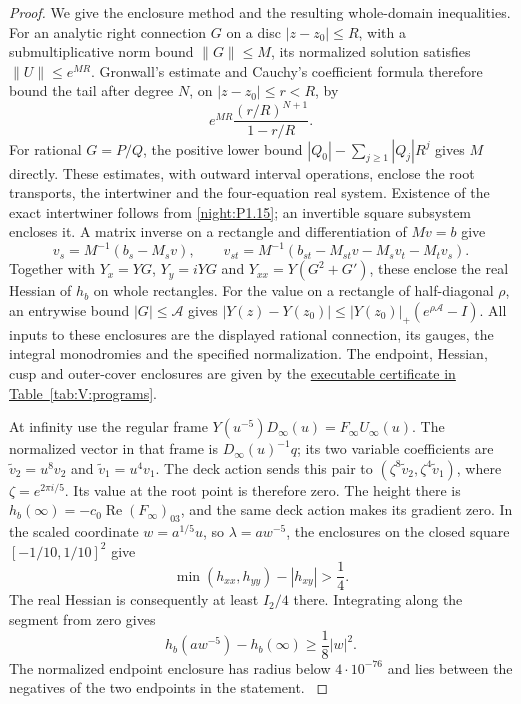 \documentclass[11pt,a4paper]{article}
\numberwithin{equation}{section}
\theoremstyle{definition}
\begin{document}
\begin{proof}
We give the enclosure method and the resulting whole-domain
inequalities. For an analytic right connection $G$ on a disc
$|z-z_0|\le R$, with a submultiplicative norm bound $\|G\|\le M$,
its normalized solution satisfies $\|U\|\le e^{MR}$.
Gronwall's estimate \cite[Lemma~2.7, pp.~42--43]{TeschlODE2012}
and Cauchy's coefficient formula
\cite[\S1.9(iii), (1.9.30)--(1.9.31)]{DLMFCauchy2026}
therefore bound the tail after degree $N$, on $|z-z_0|\le r<R$, by
\begin{equation}
 e^{MR}\frac{(r/R)^{N+1}}{1-r/R}.
\label{pub:V:eq:1-16-1}
\end{equation}
For rational $G=P/Q$, the positive lower bound
$|Q_0|-\sum_{j\ge1}|Q_j|R^j$ gives $M$ directly.
These estimates, with outward interval operations, enclose the
root transports, the intertwiner and the four-equation real
system. Existence of the exact intertwiner follows from
\cref{night:P1.15}; an invertible square subsystem encloses it.
A matrix inverse on a rectangle and differentiation of
$Mv=b$ give
\[
 v_s=M^{-1}(b_s-M_sv),\qquad
 v_{st}=M^{-1}(b_{st}-M_{st}v-M_sv_t-M_tv_s).
\]
Together with $Y_x=YG$, $Y_y=iYG$ and
$Y_{xx}=Y(G^2+G')$, these enclose the real Hessian of $h_b$
on whole rectangles. For the value on a rectangle of
half-diagonal $\rho$, an entrywise bound $|G|\le\mathcal A$
gives
$|Y(z)-Y(z_0)|\le|Y(z_0)|_+(e^{\rho\mathcal A}-I)$.
All inputs to these enclosures are the displayed rational connection, its gauges,
the integral monodromies and the specified normalization.
The endpoint, Hessian, cusp and outer-cover enclosures are given by the
\hyperlink{prog:V:height}{executable certificate in Table~\ref*{tab:V:programs}}.

At infinity use the regular frame
$Y(u^{-5})D_\infty(u)=F_\infty U_\infty(u)$.
The normalized vector in that frame is $D_\infty(u)^{-1}q$;
its two variable coefficients are
$\widetilde v_2=u^8v_2$ and $\widetilde v_1=u^4v_1$.
The deck action sends this pair to
$(\zeta^8\widetilde v_2,\zeta^4\widetilde v_1)$,
where $\zeta=e^{2\pi i/5}$. Its value at the root point
is therefore zero. The height there is
$h_b(\infty)=-c_0\operatorname{Re}(F_\infty)_{03}$,
and the same deck action makes its gradient zero.
In the scaled coordinate $w=a^{1/5}u$, so $\lambda=aw^{-5}$,
the enclosures on the closed square $[-1/10,1/10]^2$ give
\[
 \min(h_{xx},h_{yy})-|h_{xy}|>\frac14.
\]
The real Hessian is consequently at least $I_2/4$ there.
Integrating along the segment from zero gives
\[
 h_b(aw^{-5})-h_b(\infty)\ge\frac18|w|^2.
\]
The normalized endpoint enclosure has radius below $4\cdot10^{-76}$
and lies between the negatives of the two endpoints in the statement.
\hypertarget{tag-03KY}{}\label{layout:V:fresh-minimum}


\end{proof}
\end{document}
